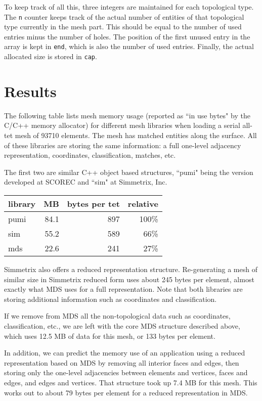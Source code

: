\documentclass{article}
\begin{document}
To keep track of all this, three integers are maintained for
each topological type.
The \texttt{n} counter keeps track of the actual number of entities
of that topological type currently in the mesh part.
This should be equal to the number of used entries minus the number
of holes.
The position of the first unused entry in the array is kept in
\texttt{end}, which is also the number of used entries.
Finally, the actual allocated size is stored in \texttt{cap}.

\section{Results}

The following table lists mesh memory usage (reported as ``in use bytes"
by the C/C++ memory allocator) for different mesh libraries
when loading a serial all-tet mesh of 93710 elements.
The mesh has matched entities along the surface.
All of these libraries are storing the same information:
a full one-level adjacency representation, coordinates,
classification, matches, etc.

The first two are similar C++ object based structures,
``pumi" being the version developed at SCOREC and
``sim" at Simmetrix, Inc.

\begin{center}
\begin{tabular}{lrrr}
library & MB & bytes per tet & relative \\\hline
pumi & 84.1 & 897 & 100\% \\
sim  & 55.2 & 589 &  66\% \\
mds  & 22.6 & 241 &  27\% \\
\end{tabular}
\end{center}

Simmetrix also offers a reduced representation structure.
Re-generating a mesh of similar size in Simmetrix reduced form
uses about 245 bytes per element, almost exactly what MDS
uses for a full representation.
Note that both libraries are storing additional information
such as coordinates and classification.

If we remove from MDS all the non-topological data such as coordinates,
classification, etc., we are left with the core MDS structure described
above, which uses 12.5 MB of data for this mesh, or 133 bytes per element.

In addition, we can predict the memory use of an application using
a reduced representation based on MDS by removing all interior
faces and edges, then storing only the one-level adjacencies
between elements and vertices, faces and edges, and edges and vertices.
That structure took up 7.4 MB for this mesh.
This works out to about 79 bytes per element for a reduced representation
in MDS.
\end{document}
